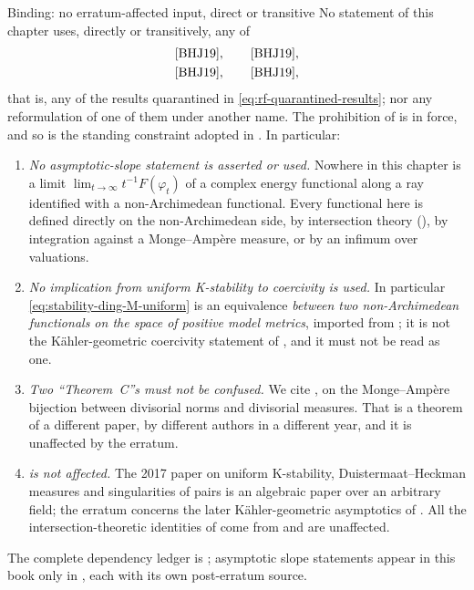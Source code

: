 \begin{warning}{Binding: no erratum-affected input, direct or transitive}
\label{warn:ch50-erratum-firewall}
No statement of this chapter uses, directly or transitively, any of
\[
 \begin{gathered}
 \text{\cite[Theorem~5.6]{BHJ19}},\qquad
 \text{\cite[Theorem~5.4]{BHJ19}},\\
 \text{\cite[Theorem~C]{BHJ19}},\qquad
 \text{\cite[Corollaries~D and~E]{BHJ19}},
 \end{gathered}
\]
that is, any of the results quarantined in
\eqref{eq:rf-quarantined-results}; nor any reformulation of one of them
under another name.  The prohibition of  is in
force, and so is the standing constraint adopted in
.  In particular:
\begin{enumerate}
\item\label{itm:ch50-fw:noslope}
      \emph{No asymptotic-slope statement is asserted or used.}  Nowhere in
      this chapter is a limit $\lim_{t\to\infty}t^{-1}F(\varphi_t)$ of a
      complex energy functional along a ray identified with a
      non-Archimedean functional.  Every functional here is defined
      directly on the non-Archimedean side, by intersection theory
      (), by integration against a Monge--Amp\`ere
      measure, or by an infimum over valuations.
\item\label{itm:ch50-fw:nocoercivity}
      \emph{No implication from uniform K-stability to coercivity is
      used.}  In particular \eqref{eq:stability-ding-M-uniform} is an
      equivalence \emph{between two non-Archimedean functionals on the
      space of positive model metrics}, imported from
      \cite[Theorem~8.6]{BHJ17}; it is not the K\"ahler-geometric
      coercivity statement of \cite[Theorem~C]{BHJ19}, and it must not be
      read as one.
\item\label{itm:ch50-fw:differentnames}
      \emph{Two ``Theorem~C''s must not be confused.}  We cite
      \cite[Theorem~C]{BJKS1}, on the Monge--Amp\`ere bijection between
      divisorial norms and divisorial measures.  That is a theorem of a
      different paper, by different authors in a different year, and it is
      unaffected by the erratum.
\item\label{itm:ch50-fw:bhj17ok}
      \emph{\cite{BHJ17} is not affected.}  The 2017 paper on uniform
      K-stability, Duistermaat--Heckman measures and singularities of pairs
      is an algebraic paper over an arbitrary field; the erratum concerns
      the later K\"ahler-geometric asymptotics of \cite{BHJ19}.  All the
      intersection-theoretic identities of
       come from \cite{BHJ17} and are
      unaffected.
\end{enumerate}
The complete dependency ledger is ; asymptotic
slope statements appear in this book only in
, each with its own post-erratum source.
\end{warning}


